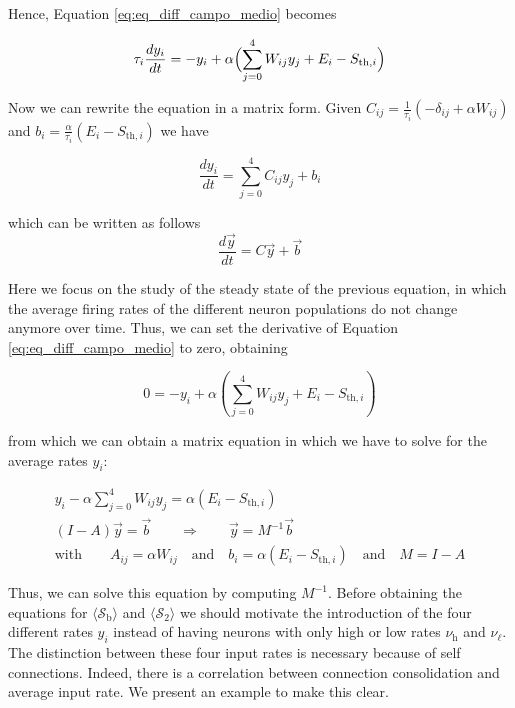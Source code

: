 \documentclass[a4paper, 12pt, twoside, openright]{book}
\newcommand{\rh}{\nu_\text{h}}
\newcommand{\rl}{\nu_{\ell}}
\newcommand{\SII}{\mathcal{S}_\text{2}}
\newcommand{\Sb}{\mathcal{S}_\text{b}}
\begin{document}
Hence, Equation \eqref{eq:eq_diff_campo_medio} becomes

\begin{equation}
    \tau_i \frac{d y_i}{dt}= -y_i + \alpha \Bigl( \sum_{j=0}^{4} W_{ij} y_j+E_i-S_{\text{th},i}\Bigr)
\end{equation}

Now we can rewrite the equation in a matrix form. Given $C_{ij}= \frac{1}{\tau_i} ( - \delta_{ij} + \alpha W_{ij})$ and $b_i= \frac{\alpha}{\tau_i} (E_i - S_{\text{th},i})$ we have

\begin{equation}
   \dfrac{d y_i}{dt}=  \sum_{j=0}^{4} C_{ij} y_j+b_i
\end{equation}

which can be written as follows
\begin{equation}
    \frac{d \vec{y}}{dt} = C \vec{y}+ \vec{b}
\end{equation}

Here we focus on the study of the steady state of the previous equation, in which the average firing rates of the different neuron populations do not change anymore over time. Thus, we can set the derivative of Equation \eqref{eq:eq_diff_campo_medio} to zero, obtaining

\begin{equation}
\label{eq:asintotic_condition}
    0= - y_i + \alpha( \sum_{j=0}^{4} W_{ij} y_j+E_i-S_{\text{th},i})
\end{equation}

from which we can obtain a matrix equation in which we have to solve for the average rates $y_i$:

\begin{equation}
\begin{gathered}
y_i-\alpha \sum_{j=0}^{4} W_{ij} y_j = \alpha (E_i- S_{\text{th},i})\\
                                    (I-A) \vec{y}=\vec{b} \qquad  \Longrightarrow \qquad \vec{y}= M^{-1} \vec{b}  \\ 
\text{with} \qquad A_{ij}=\alpha  W_{ij}    \quad \text{and} \quad b_{i}=\alpha (E_i-S_{\text{th},i}) \quad \text{and} \quad M=I-A
\end{gathered}
\end{equation}

Thus, we can solve this equation by computing $M^{-1}$. Before obtaining the equations for $\langle\Sb\rangle$ and $\langle\SII\rangle$ we should motivate the introduction of the four different rates $y_i$ instead of having neurons with only high or low rates $\rh$ and $\rl$. The distinction between these four input rates is necessary because of self connections. Indeed, there is a correlation between connection consolidation and average input rate. We present an example to make this clear. 
\end{document}
